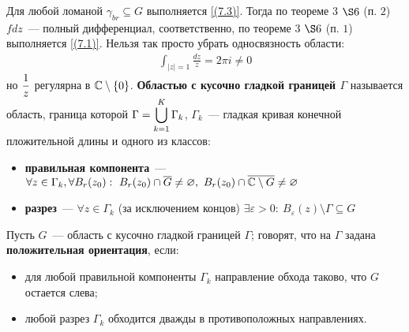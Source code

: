 Для любой ломаной $\gamma_{br}\subseteq G$ выполняется \eqref{(7.3)}.
Тогда по теореме $3$ $\S 6$ (п. $2$) $f dz$~--- полный дифференциал,
соответственно, по теореме $3$ $\S 6$ (п. $1$) выполняется \eqref{(7.1)}.
\note
Нельзя так просто убрать односвязность области:
\begin{align*}
  \int_{\left| z \right| = 1} \frac{dz}{z} = 2 \pi i \neq 0
\end{align*}
но $\displaystyle \frac{1}{z}$ регулярна в $\mathbb{C} \setminus \{0\}$.
\Def
\textbf{Областью с кусочно гладкой границей $\Gamma$} называется область,
граница которой $\Gamma = \displaystyle \bigcup_{k=1}^K\Gamma_k$, $\Gamma_k$~--- гладкая
кривая конечной пложительной длины и одного из классов:
\begin{itemize}
    \item \textbf{правильная компонента}~--- $\forall z \in \Gamma_k, \forall
    B_r(z_0): \ B_r(z_0)\cap \overline{G} \neq \varnothing, \ B_r(z_0) \cap
    \overline{\mathbb{C}\setminus G} \neq \varnothing$
    \item \textbf{разрез}~--- $\forall z \in \Gamma_k$ (за исключением концов)
    $\exists \varepsilon > 0: \ B_{\varepsilon}(z) \setminus \Gamma \subseteq G$
\end{itemize}
\Def
Пусть $G$~--- область с кусочно гладкой границей $\Gamma$; говорят, что на
$\Gamma$ задана \textbf{положительная ориентация}, если:
\begin{itemize}
    \item для любой правильной компоненты $\Gamma_k$ направление обхода таково,
    что $G$ остается слева;
    \item любой разрез $\Gamma_k$ обходится дважды в противоположных
    направлениях.
\end{itemize}

